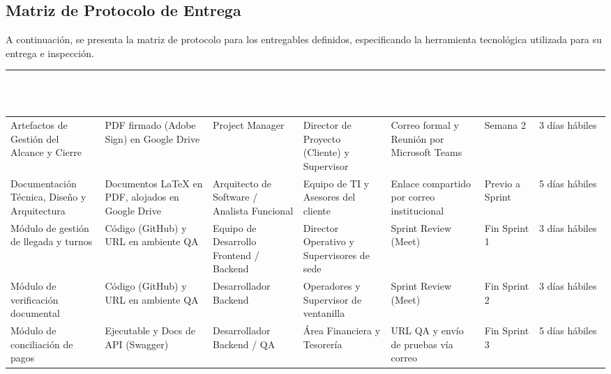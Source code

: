 \subsection{Matriz de Protocolo de Entrega}

A continuación, se presenta la matriz de protocolo para los entregables definidos, especificando la herramienta tecnológica utilizada para su entrega e inspección.

\begin{table}[H]
\centering
\scriptsize 
\setlength{\tabcolsep}{4pt}
\renewcommand{\arraystretch}{1.5}
\begin{tabular}{|p{3cm}|p{2.2cm}|p{2.5cm}|p{2.5cm}|p{2.5cm}|p{1.5cm}|p{1.5cm}|}
\hline
\rowcolor[HTML]{003366} 
\textcolor{white}{\textbf{ENTREGABLE}} & 
\textcolor{white}{\textbf{FORMATO Y HERRAMIENTA}} & 
\textcolor{white}{\textbf{RESPONSABLE DE COMUNICAR}} & 
\textcolor{white}{\textbf{RECEPTOR}} & 
\textcolor{white}{\textbf{CANAL DE COMUNICACION}} & 
\textcolor{white}{\textbf{FECHA ENTREGA}} & 
\textcolor{white}{\textbf{LIMITE OBSERVACIONES}} \\ \hline

Artefactos de Gestión del Alcance y Cierre & PDF firmado (Adobe Sign) en Google Drive & Project Manager & Director de Proyecto (Cliente) y Supervisor & Correo formal y Reunión por Microsoft Teams & Semana 2 & 3 días hábiles \\ \hline

Documentación Técnica, Diseño y Arquitectura & Documentos LaTeX en PDF, alojados en Google Drive & Arquitecto de Software / Analista Funcional & Equipo de TI y Asesores del cliente & Enlace compartido por correo institucional & Previo a Sprint & 5 días hábiles \\ \hline

Módulo de gestión de llegada y turnos & Código (GitHub) y URL en ambiente QA & Equipo de Desarrollo Frontend / Backend & Director Operativo y Supervisores de sede & Sprint Review (Meet) & Fin Sprint 1 & 3 días hábiles \\ \hline

Módulo de verificación documental & Código (GitHub) y URL en ambiente QA & Desarrollador Backend & Operadores y Supervisor de ventanilla & Sprint Review (Meet) & Fin Sprint 2 & 3 días hábiles \\ \hline

Módulo de conciliación de pagos & Ejecutable y Docs de API (Swagger) & Desarrollador Backend / QA & Área Financiera y Tesorería & URL QA y envío de pruebas vía correo & Fin Sprint 3 & 5 días hábiles \\ \hline


\end{tabular}
\end{table}
